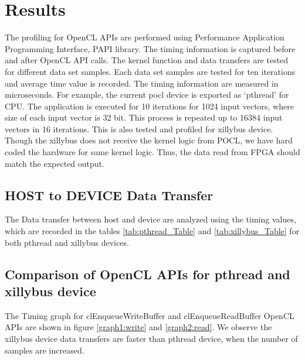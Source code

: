 \section{Results}
The profiling for OpenCL APIs are performed using Performance Application Programming Interface, PAPI library. The timing information is captured before and after OpenCL API calls. The kernel function and data transfers are tested for different data set samples. Each data set samples are tested for ten iterations and average time value is recorded. The timing information are measured in microseconds. For example, the current pocl device is exported as ‘pthread’ for CPU. The application is executed for 10 iterations for 1024 input vectors, where size of each input vector is 32 bit. This process is repeated up to 16384 input vectors in 16 iterations. This is also tested and profiled for xillybus device. Though the xillybus does not receive the kernel logic from POCL, we have hard coded the hardware for same kernel logic. Thus, the data read from FPGA should match the expected output. 

\subsection{HOST to DEVICE Data Transfer}
The Data transfer between host and device are analyzed using the timing values, which are recorded in the tables \ref{tab:pthread_Table} and \ref{tab:xillybus_Table} for both pthread and xillybus devices.



\subsection{Comparison of OpenCL APIs for pthread and xillybus device}
The Timing graph for clEnqueueWriteBuffer and clEnqueueReadBuffer OpenCL APIs are shown in figure \ref{graph1:write} and \ref{graph2:read}. We observe the xillybus device data transfers are faster than pthread device, when the number of samples are increased.


